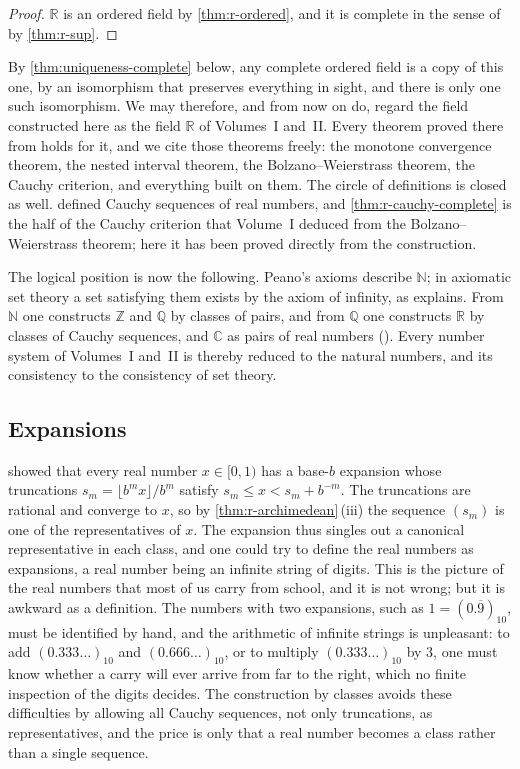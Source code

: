 \begin{proof}
$\mathbb R$ is an ordered field by \cref{thm:r-ordered}, and it is complete in the sense of  by \cref{thm:r-sup}.
\end{proof}

By \cref{thm:uniqueness-complete} below, any complete ordered field is a copy of this one, by an isomorphism that preserves everything in sight, and there is only one such isomorphism. We may therefore, and from now on do, regard the field constructed here as the field $\mathbb R$ of Volumes~I and~II. Every theorem proved there from  holds for it, and we cite those theorems freely: the monotone convergence theorem, the nested interval theorem, the Bolzano--Weierstrass theorem, the Cauchy criterion, and everything built on them. The circle of definitions is closed as well.  defined Cauchy sequences of real numbers, and \cref{thm:r-cauchy-complete} is the half of the Cauchy criterion  that Volume~I deduced from the Bolzano--Weierstrass theorem; here it has been proved directly from the construction.

The logical position is now the following. Peano's axioms describe $\mathbb N$; in axiomatic set theory a set satisfying them exists by the axiom of infinity, as  explains. From $\mathbb N$ one constructs $\mathbb Z$ and $\mathbb Q$ by classes of pairs, and from $\mathbb Q$ one constructs $\mathbb R$ by classes of Cauchy sequences, and $\mathbb C$ as pairs of real numbers (). Every number system of Volumes~I and~II is thereby reduced to the natural numbers, and its consistency to the consistency of set theory.

\subsection{Expansions}

 showed that every real number $x\in[0,1)$ has a base-$b$ expansion whose truncations $s_m=\lfloor b^mx\rfloor/b^m$ satisfy $s_m\le x<s_m+b^{-m}$. The truncations are rational and converge to $x$, so by \cref{thm:r-archimedean}\,(iii) the sequence $(s_m)$ is one of the representatives of $x$. The expansion thus singles out a canonical representative in each class, and one could try to define the real numbers as expansions, a real number being an infinite string of digits. This is the picture of the real numbers that most of us carry from school, and it is not wrong; but it is awkward as a definition. The numbers with two expansions, such as $1=(0.\overline9)_{10}$, must be identified by hand, and the arithmetic of infinite strings is unpleasant: to add $(0.333\ldots)_{10}$ and $(0.666\ldots)_{10}$, or to multiply $(0.333\ldots)_{10}$ by $3$, one must know whether a carry will ever arrive from far to the right, which no finite inspection of the digits decides. The construction by classes avoids these difficulties by allowing all Cauchy sequences, not only truncations, as representatives, and the price is only that a real number becomes a class rather than a single sequence.

